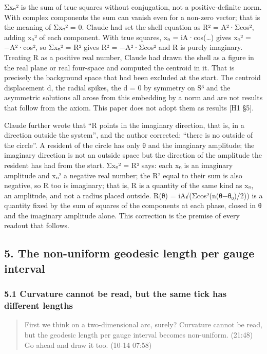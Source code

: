 \documentclass[
  a4paper,
]{article}
\begin{document}
Σxₙ² is the sum of true squares without conjugation, not a
positive-definite norm. With complex components the sum can vanish even
for a non-zero vector; that is the meaning of Σxₙ² = 0. Claude had set
the shell equation as R² = A²·Σcos², adding \textbar xₙ\textbar² of each
component. With true squares, xₙ = iA·cos(\ldots) gives xₙ² = −A²·cos²,
so Σxₙ² = R² gives R² = −A²·Σcos² and R is purely imaginary. Treating R
as a positive real number, Claude had drawn the shell as a figure in the
real plane or real four-space and computed the centroid in it. That is
precisely the background space that had been excluded at the start. The
centroid displacement d, the radial spikes, the d = 0 by symmetry on S³
and the asymmetric solutions all arose from this embedding by a norm and
are not results that follow from the axiom. This paper does not adopt
them as results {[}H1 §5{]}.

Claude further wrote that ``R points in the imaginary direction, that
is, in a direction outside the system'', and the author corrected:
``there is no outside of the circle''. A resident of the circle has only
θ and the imaginary amplitude; the imaginary direction is not an outside
space but the direction of the amplitude the resident has had from the
start. Σxₙ² = R² says: each xₙ is an imaginary amplitude and xₙ² a
negative real number; the R² equal to their sum is also negative, so R
too is imaginary; that is, R is a quantity of the same kind as xₙ, an
amplitude, and not a radius placed outside. R(θ) = iA√(Σcos²(n(θ−θ₀)/2))
is a quantity fixed by the sum of squares of the components at each
phase, closed in θ and the imaginary amplitude alone. This correction is
the premise of every readout that follows.

\subsection{5. The non-uniform geodesic length per gauge
interval}\label{the-non-uniform-geodesic-length-per-gauge-interval}

\subsubsection{5.1 Curvature cannot be read, but the same tick has
different
lengths}\label{curvature-cannot-be-read-but-the-same-tick-has-different-lengths}

\begin{quote}
First we think on a two-dimensional arc, surely? Curvature cannot be
read, but the geodesic length per gauge interval becomes non-uniform.
(21:48) Go ahead and draw it too. (10-14 07:58)
\end{quote}
\end{document}
